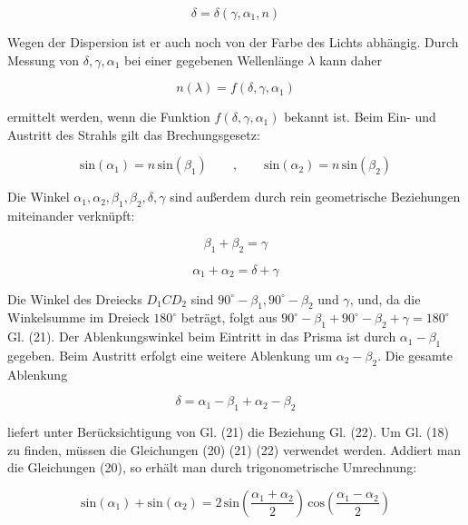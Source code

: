 \documentclass[11pt,ngerman]{scrartcl}
\begin{document}
\begin{equation}
	\delta = \delta(\gamma, \alpha_1, n)
\end{equation}

Wegen der Dispersion ist er auch noch von der Farbe des Lichts abhängig. Durch Messung von
$\delta, \gamma, \alpha_1$ bei einer gegebenen Wellenlänge $\lambda$ kann daher

\begin{equation}
	n(\lambda) = f(\delta, \gamma, \alpha_1)
\end{equation}

ermittelt werden, wenn die Funktion $f(\delta, \gamma, \alpha_1)$ bekannt ist. Beim Ein- und Austritt des Strahls
gilt das Brechungsgesetz:

\begin{equation}
	\textrm{sin}(\alpha_1)= n \,\textrm{sin}(\beta_1) \qquad , \qquad \textrm{sin}(\alpha_2)= n \,\textrm{sin}(\beta_2)
\end{equation}

Die Winkel $\alpha_1, \alpha_2, \beta_1, \beta_2, \delta, \gamma$ sind außerdem durch rein geometrische Beziehungen miteinander
verknüpft:

\begin{equation}
	\beta_1 + \beta_2 = \gamma
\end{equation}

\begin{equation}
	\alpha_1 + \alpha_2 = \delta + \gamma
\end{equation}

Die Winkel des Dreiecks $D_1 CD_2$ sind $90^\circ - \beta_1, 90^\circ - \beta_2$ und $\gamma$, und, da die Winkelsumme im
Dreieck $180^\circ$ beträgt, folgt aus $90^\circ - \beta_1 + 90^\circ - \beta_2 + \gamma = 180^\circ$ Gl. (21).
Der Ablenkungswinkel beim Eintritt in das Prisma ist durch $\alpha_1 - \beta_1$ gegeben. Beim Austritt
erfolgt eine weitere Ablenkung um $\alpha_2 - \beta_2$. Die gesamte Ablenkung

\begin{equation}
	\delta = \alpha_1 - \beta_1 + \alpha_2 - \beta_2
\end{equation}

liefert unter Berücksichtigung von Gl. (21) die Beziehung Gl. (22). Um Gl. (18) zu finden, müssen
die Gleichungen (20) (21) (22) verwendet werden. Addiert man die Gleichungen (20), so erhält man
durch trigonometrische Umrechnung:

\begin{equation}
	\textrm{sin}(\alpha_1) + \textrm{sin}(\alpha_2) = 2\, \textrm{sin}\left(\frac{\alpha_1 + \alpha_2}{2}\right) \,\textrm{cos}\left(\frac{\alpha_1 - \alpha_2}{2}\right)
\end{equation}
\end{document}
